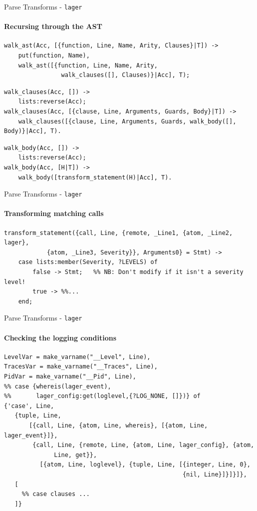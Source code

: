 \documentclass[c]{beamer}
\begin{document}
\begin{frame}[fragile]{Parse Transforms - \texttt{lager}}
\framesubtitle{Recursing through the AST}
  \begin{lstlisting}[emph={walk_clauses}]
walk_ast(Acc, [{function, Line, Name, Arity, Clauses}|T]) ->
    put(function, Name),
    walk_ast([{function, Line, Name, Arity,
                walk_clauses([], Clauses)}|Acc], T);
  \end{lstlisting}
  \pause
  \begin{lstlisting}[emph={walk_body}]
walk_clauses(Acc, []) ->
    lists:reverse(Acc);
walk_clauses(Acc, [{clause, Line, Arguments, Guards, Body}|T]) ->
    walk_clauses([{clause, Line, Arguments, Guards, walk_body([], Body)}|Acc], T).
  \end{lstlisting}
  \pause
  \begin{lstlisting}[emph={transform_statement}]
walk_body(Acc, []) ->
    lists:reverse(Acc);
walk_body(Acc, [H|T]) ->
    walk_body([transform_statement(H)|Acc], T).
  \end{lstlisting}
\end{frame}

\begin{frame}[fragile]{Parse Transforms - \texttt{lager}}
\framesubtitle{Transforming matching calls}
\begin{lstlisting}[emph={Severity,lager}]
transform_statement({call, Line, {remote, _Line1, {atom, _Line2, lager},
            {atom, _Line3, Severity}}, Arguments0} = Stmt) ->
    case lists:member(Severity, ?LEVELS) of
        false -> Stmt;   %% NB: Don't modify if it isn't a severity level!
        true -> %%...
    end;
\end{lstlisting}
\end{frame}

\begin{frame}[fragile]{Parse Transforms - \texttt{lager}}
\framesubtitle{Checking the logging conditions}
\begin{lstlisting}[emph={lager,do_log}]
LevelVar = make_varname("__Level", Line),
TracesVar = make_varname("__Traces", Line),
PidVar = make_varname("__Pid", Line),
%% case {whereis(lager_event),
%%       lager_config:get(loglevel,{?LOG_NONE, []})} of
{'case', Line,
   {tuple, Line,
       [{call, Line, {atom, Line, whereis}, [{atom, Line, lager_event}]},
        {call, Line, {remote, Line, {atom, Line, lager_config}, {atom,
              Line, get}},
          [{atom, Line, loglevel}, {tuple, Line, [{integer, Line, 0},
                                                  {nil, Line}]}]}]},
   [
     %% case clauses ...
   ]}
\end{lstlisting}
\end{frame}
\end{document}

